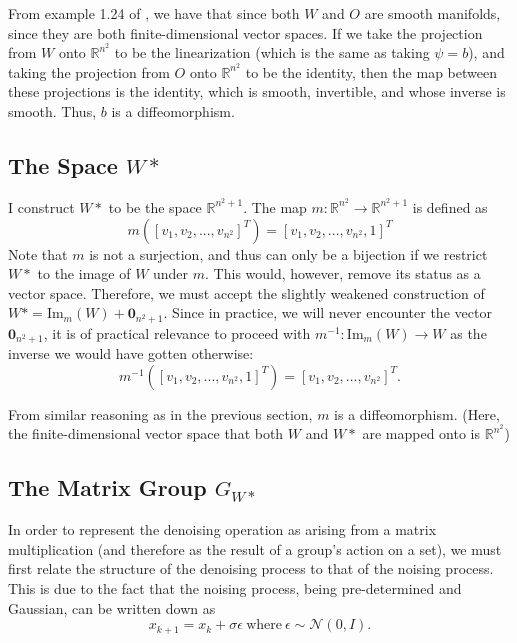 \documentclass[10pt]{article} %
\begin{document}
From example 1.24 of \cite{lee2013introduction}, we have that since both $W$ and $O$ are smooth manifolds, since they are both finite-dimensional vector spaces.
If we take the projection from $W$ onto $\mathbb{R}^{n^2}$ to be the linearization (which is the same as taking $\psi = b$), and taking the projection from $O$ onto $\mathbb{R}^{n^2}$ to be the identity, then the map between these projections is the identity, which is smooth, invertible, and whose inverse is smooth. Thus, $b$ is a diffeomorphism.

\subsection{The Space $W*$}
I construct $W*$ to be the space $\mathbb{R}^{n^2 + 1}$. The map $m: \mathbb{R}^{n^2} \rightarrow \mathbb{R}^{n^2 + 1}$ is defined as 
\[ 
  m([v_1, v_2, ..., v_{n^2}]^T) = [v_1, v_2, ..., v_{n^2}, 1]^T
\]
Note that $m$ is not a surjection, and thus can only be a bijection if we restrict $W*$ to the image of $W$ under $m$. This would, however, remove its status as a vector space. Therefore, we must accept the slightly weakened construction of $W* = \text{Im}_m(W) + \mathbf{0}_{n^2 + 1}$. Since in practice, we will never encounter the vector $\mathbf{0}_{n^2 + 1}$, it is of practical relevance to proceed with $m^{-1}:\text{Im}_m(W) \rightarrow W$ as the inverse we would have gotten otherwise:
\[ 
  m^{-1}([v_1, v_2, ..., v_{n^2}, 1]^T) = [v_1, v_2, ..., v_{n^2}]^T
.\]

From similar reasoning as in the previous section, $m$ is a diffeomorphism. (Here, the finite-dimensional vector space that both $W$ and $W*$ are mapped onto is $\mathbb{R}^{n^2}$)

\subsection{The Matrix Group $G_{W*}$}

In order to represent the denoising operation as arising from a matrix multiplication (and therefore as the result of a group's action on a set), we must first relate the structure of the denoising process to that of the noising process. This is due to the fact that the noising process, being pre-determined and Gaussian, can be written down as 
\[ 
x_{k+1} = x_k + \sigma \epsilon ~\text{where}~\epsilon \sim \mathcal{N}(0, I)
.\]
\end{document}
